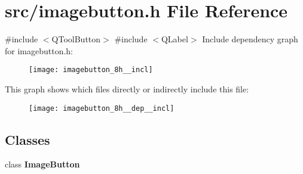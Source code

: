 \section{src/imagebutton.h File Reference}
\label{imagebutton_8h}
{\ttfamily \#include $<$Q\+Tool\+Button$>$}\newline
{\ttfamily \#include $<$Q\+Label$>$}\newline
Include dependency graph for imagebutton.\+h\+:\nopagebreak
\begin{figure}[H]
\begin{center}
\leavevmode
\texttt{[image: imagebutton\_8h\_\_incl]}
\end{center}
\end{figure}
This graph shows which files directly or indirectly include this file\+:\nopagebreak
\begin{figure}[H]
\begin{center}
\leavevmode
\texttt{[image: imagebutton\_8h\_\_dep\_\_incl]}
\end{center}
\end{figure}
\subsection*{Classes}
\begin{DoxyCompactItemize}
\item 
class \textbf{ Image\+Button}
\end{DoxyCompactItemize}
